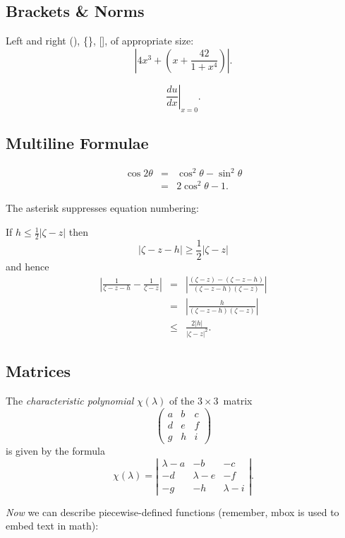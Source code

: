 \documentclass[a4paper,12pt,titlepage]{article}
\begin{document}
\subsection*{Brackets \& Norms}

Left and right (), \{\}, [], of appropriate size:
	\[ \left| 4 x^3 + \left( x + \frac{42}{1+x^4} \right) \right|.\]

	\[ \left. \frac{du}{dx} \right|_{x=0}.\] 

\subsection*{Multiline Formulae}

\begin{eqnarray}
\cos 2\theta & = & \cos^2 \theta - \sin^2 \theta \\
             & = & 2 \cos^2 \theta - 1.
\end{eqnarray}

The asterisk suppresses equation numbering:

If $h \leq \frac{1}{2} |\zeta - z|$ then
	\[ |\zeta - z - h| \geq \frac{1}{2} |\zeta - z|\] 
and hence
	\begin{eqnarray*}
	\left| \frac{1}{\zeta - z - h} - \frac{1}{\zeta - z} \right|
	& = & \left|
	\frac{(\zeta - z) - (\zeta - z - h)}{(\zeta - z - h)(\zeta - z)}
	\right| \\  & = &
	\left| \frac{h}{(\zeta - z - h)(\zeta - z)} \right| \\
		& \leq & \frac{2 |h|}{|\zeta - z|^2}.
	\end{eqnarray*}


\subsection*{Matrices}

The \emph{characteristic polynomial} $\chi(\lambda)$ of the
$3 \times 3$~matrix
\[ \left( \begin{array}{ccc}
a & b & c \\
d & e & f \\
g & h & i \end{array} \right)\] 
is given by the formula
\[ \chi(\lambda) = \left| \begin{array}{ccc}
\lambda - a & -b & -c \\
-d & \lambda - e & -f \\
-g & -h & \lambda - i \end{array} \right|.\]


\emph{Now} we can describe piecewise-defined functions (remember, mbox is
used to embed text in math):
\end{document}
